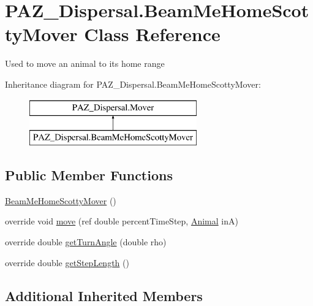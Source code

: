 \hypertarget{class_p_a_z___dispersal_1_1_beam_me_home_scotty_mover}{\section{P\-A\-Z\-\_\-\-Dispersal.\-Beam\-Me\-Home\-Scotty\-Mover Class Reference}
\label{class_p_a_z___dispersal_1_1_beam_me_home_scotty_mover}
}


Used to move an animal to its home range  


Inheritance diagram for P\-A\-Z\-\_\-\-Dispersal.\-Beam\-Me\-Home\-Scotty\-Mover\-:\begin{figure}[H]
\begin{center}
\leavevmode
\includegraphics[height=2.000000cm]{class_p_a_z___dispersal_1_1_beam_me_home_scotty_mover}
\end{center}
\end{figure}
\subsection*{Public Member Functions}
\begin{DoxyCompactItemize}
\item 
\hyperlink{class_p_a_z___dispersal_1_1_beam_me_home_scotty_mover_a778ca74679a4099ff0f69b5e4ebd3e62}{Beam\-Me\-Home\-Scotty\-Mover} ()
\item 
override void \hyperlink{class_p_a_z___dispersal_1_1_beam_me_home_scotty_mover_afb4b96d0fe51e5498ccdbb816cf81a69}{move} (ref double percent\-Time\-Step, \hyperlink{class_p_a_z___dispersal_1_1_animal}{Animal} in\-A)
\item 
override double \hyperlink{class_p_a_z___dispersal_1_1_beam_me_home_scotty_mover_a93b479e40daf069d62e7b3bab53100d4}{get\-Turn\-Angle} (double rho)
\item 
override double \hyperlink{class_p_a_z___dispersal_1_1_beam_me_home_scotty_mover_a84d47e4808e7e1f376f8ce5894333397}{get\-Step\-Length} ()
\end{DoxyCompactItemize}
\subsection*{Additional Inherited Members}


